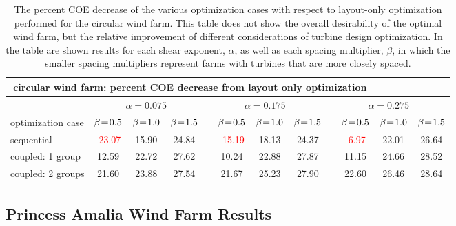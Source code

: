 \begin{center}
\begin{table}
\caption{The percent COE decrease of the various optimization cases with respect to layout-only optimization performed for the circular wind farm. This table does not show the overall desirability of the optimal wind farm, but the relative improvement of different considerations of turbine design optimization. In the table are shown results for each shear exponent, $\alpha$, as well as each spacing multiplier, $\beta$, in which the smaller spacing multipliers represent farms with turbines that are more closely spaced.}
\label{circular_table}
\begin{tabular}{p{2.5cm} c c c c c c c c c c c}
\hline
\multicolumn{10}{c}{\textbf{circular wind farm: percent COE decrease from layout only optimization}}\\
\hline
 & \multicolumn{3}{c}{$\alpha=0.075$} & \multicolumn{4}{c}{$\alpha=0.175$} & \multicolumn{4}{c}{$\alpha=0.275$}\\
\hline
optimization case & $\beta\mkern1.5mu{=}\mkern1.5mu0.5$ & $\beta\mkern1.5mu{=}\mkern1.5mu1.0$ & $\beta\mkern1.5mu{=}\mkern1.5mu1.5$ & & $\beta\mkern1.5mu{=}\mkern1.5mu0.5$ & $\beta\mkern1.5mu{=}\mkern1.5mu1.0$ & $\beta\mkern1.5mu{=}\mkern1.5mu1.5$& &$\beta\mkern1.5mu{=}\mkern1.5mu0.5$ & $\beta\mkern1.5mu{=}\mkern1.5mu1.0$ & $\beta\mkern1.5mu{=}\mkern1.5mu1.5$\\
sequential & \textcolor{red}{-23.07} & 15.90 & 24.84 & & \textcolor{red}{-15.19}  & 18.13 & 24.37 & & \textcolor{red}{-6.97}  & 22.01 & 26.64\\
coupled: 1 group& 12.59  & 22.72  & 27.62  & & 10.24  & 22.88  & 27.87 & & 11.15 & 24.66 & 28.52 \\
coupled: 2 groups & 21.60  & 23.88  & 27.54 & & 21.67  & 25.23  &  27.90 & &  22.60 & 26.46  & 28.64\\
\hline
\end{tabular}
\end{table}
\end{center}











\subsection{Princess Amalia Wind Farm Results}


